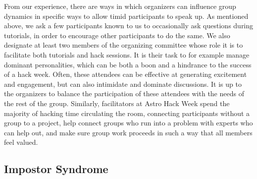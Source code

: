 \documentclass{nature}
\begin{document}
From our experience, there are ways in which organizers can influence group dynamics in specific ways to allow timid participants to speak up. As mentioned above, we ask a few participants known to us to occasionally ask questions during tutorials, in order to encourage other participants to do the same. We also designate at least two members of the organizing committee whose role it is to facilitate both tutorials and hack sessions. It is their task to for example manage dominant personalities, which can be both a boon and a hindrance to the success of a hack week. Often, these attendees can be effective at generating excitement and engagement, but can also intimidate and dominate discussions. It is up to the organizers to balance the participation of these attendees with the needs of the rest of the group. Similarly, facilitators at Astro Hack Week spend the majority of hacking time circulating the room, connecting participants without a group to a project, help connect groups who run into a problem with experts who can help out, and make sure group work proceeds in such a way that all members feel valued.


\subsection{Impostor Syndrome}
\end{document}
